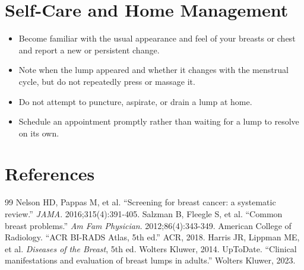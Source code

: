 \section*{Self-Care and Home Management}
\begin{itemize}
 \item Become familiar with the usual appearance and feel of your breasts or chest and report a new or persistent change.
 \item Note when the lump appeared and whether it changes with the menstrual cycle, but do not repeatedly press or massage it.
 \item Do not attempt to puncture, aspirate, or drain a lump at home.
 \item Schedule an appointment promptly rather than waiting for a lump to resolve on its own.
\end{itemize}

\section*{References}
\begin{thebibliography}{99}
 Nelson HD, Pappas M, et al. ``Screening for breast cancer: a systematic review.'' \textit{JAMA}. 2016;315(4):391-405.
 Salzman B, Fleegle S, et al. ``Common breast problems.'' \textit{Am Fam Physician}. 2012;86(4):343-349.
 American College of Radiology. ``ACR BI-RADS Atlas, 5th ed.'' ACR, 2018.
 Harris JR, Lippman ME, et al. \textit{Diseases of the Breast}, 5th ed. Wolters Kluwer, 2014.
 UpToDate. ``Clinical manifestations and evaluation of breast lumps in adults.'' Wolters Kluwer, 2023.
\end{thebibliography}
